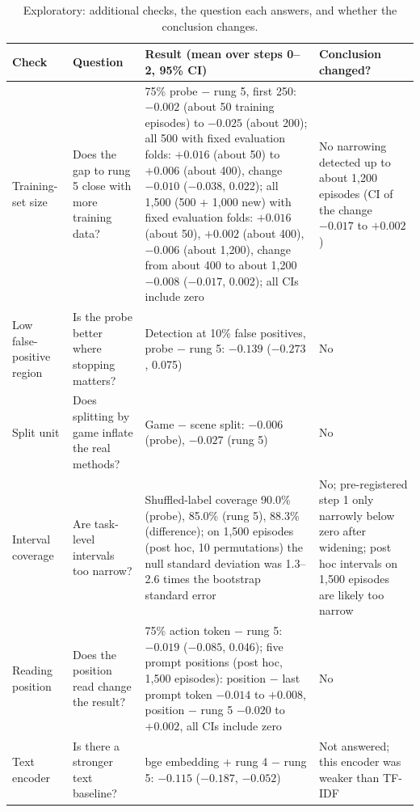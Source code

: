 \begin{table}[htbp]
\centering\small
\caption{Exploratory: additional checks, the question each answers, and whether the conclusion changes.}\label{tab:extrasum}
\begin{tabularx}{\linewidth}{@{}lLLL@{}}
\toprule
Check & Question & Result (mean over steps 0--2, 95\% CI) & Conclusion changed? \\
\midrule
Training-set size & Does the gap to rung 5 close with more training data? & 75\% probe $-$ rung 5, first 250: $-0.002$ (about 50 training episodes) to $-0.025$ (about 200); all 500 with fixed evaluation folds: $+0.016$ (about 50) to $+0.006$ (about 400), change $-0.010$ ($-0.038$, 0.022); all 1,500 (500 + 1,000 new) with fixed evaluation folds: $+0.016$ (about 50), $+0.002$ (about 400), $-0.006$ (about 1,200), change from about 400 to about 1,200 $-0.008$ ($-0.017$, 0.002); all CIs include zero & No narrowing detected up to about 1,200 episodes (CI of the change $-0.017$ to $+0.002$) \\
Low false-positive region & Is the probe better where stopping matters? & Detection at 10\% false positives, probe $-$ rung 5: $-0.139$ ($-0.273$, 0.075) & No \\
Split unit & Does splitting by game inflate the real methods? & Game $-$ scene split: $-0.006$ (probe), $-0.027$ (rung 5) & No \\
Interval coverage & Are task-level intervals too narrow? & Shuffled-label coverage 90.0\% (probe), 85.0\% (rung 5), 88.3\% (difference); on 1,500 episodes (post hoc, 10 permutations) the null standard deviation was 1.3--2.6 times the bootstrap standard error & No; pre-registered step 1 only narrowly below zero after widening; post hoc intervals on 1,500 episodes are likely too narrow \\
Reading position & Does the position read change the result? & 75\% action token $-$ rung 5: $-0.019$ ($-0.085$, 0.046); five prompt positions (post hoc, 1,500 episodes): position $-$ last prompt token $-0.014$ to $+0.008$, position $-$ rung 5 $-0.020$ to $+0.002$, all CIs include zero & No \\
Text encoder & Is there a stronger text baseline? & bge embedding + rung 4 $-$ rung 5: $-0.115$ ($-0.187$, $-0.052$) & Not answered; this encoder was weaker than TF-IDF \\
\bottomrule
\end{tabularx}
\end{table}
